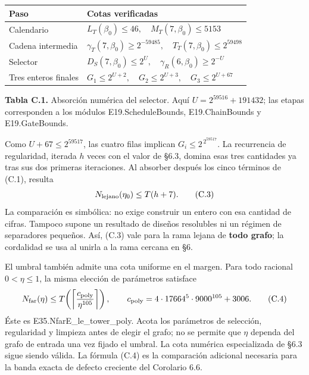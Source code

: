 \documentclass[spanish,11pt,a4paper]{article}
\newcounter{none}
\begin{document}

{\def\LTcaptype{none} %
\begin{longtable}[c]{@{}
  >{\raggedright\arraybackslash}p{}
  >{\raggedright\arraybackslash}p{}@{}}
\toprule\noalign{}
\begin{minipage}[b]{\linewidth}\raggedright
Paso
\end{minipage} & \begin{minipage}[b]{\linewidth}\raggedright
Cotas verificadas
\end{minipage} \\
\midrule\noalign{}
\endhead
\bottomrule\noalign{}
\endlastfoot
Calendario & \(L_T(\beta_0)\le46,\quad M_T(7,\beta_0)\le5153\) \\
Cadena intermedia & \(\gamma_T(7,\beta_0)\ge2^{-59485},\quad T_T(7,\beta_0)\le2^{59498}\) \\
Selector & \(D_S(7,\beta_0)\le2^U,\quad \gamma_R(6,\beta_0)\ge2^{-U}\) \\
Tres enteros finales & \(G_1\le2^{U+2},\quad G_2\le2^{U+3},\quad G_3\le2^{U+67}\) \\
\end{longtable}
}

\textbf{Tabla C.1.} Absorción numérica del selector. Aquí \(U=2^{59516}+191432\); las etapas corresponden a los módulos E19.ScheduleBounds, E19.ChainBounds y E19.GateBounds.

Como \(U+67\le2^{59517}\), las cuatro filas implican \(G_i\le2^{\,2^{59517}}\). La recurrencia de regularidad, iterada \(h\) veces con el valor de §6.3, domina esas tres cantidades ya tras sus dos primeras iteraciones. Al absorber después los cinco términos de (C.1), resulta \[
N_{\rm lejano}(\eta_0)\le T(h+7).
\tag{C.3}
\] La comparación es simbólica: no exige construir un entero con esa cantidad de cifras. Tampoco supone un resultado de diseños resolubles ni un régimen de separadores pequeños. Así, (C.3) vale para la rama lejana de \textbf{todo grafo}; la cordalidad se usa al unirla a la rama cercana en §6.

El umbral también admite una cota uniforme en el margen. Para todo racional \(0<\eta\le1\), la misma elección de parámetros satisface \[
N_{\rm far}(\eta)\le
T\!\left(\left\lceil\frac{c_{\rm poly}}{\eta^{105}}\right\rceil\right),
\qquad c_{\rm poly}=4\cdot17664^5\cdot9000^{105}+3006.
\tag{C.4}
\] Éste es {\ttfamily\small E35.\discretionary{\hbox{\ensuremath{\hookrightarrow}}}{}{}NfarE\_\discretionary{\hbox{\ensuremath{\hookrightarrow}}}{}{}le\_\discretionary{\hbox{\ensuremath{\hookrightarrow}}}{}{}tower\_\discretionary{\hbox{\ensuremath{\hookrightarrow}}}{}{}poly}. Acota los parámetros de selección, regularidad y limpieza antes de elegir el grafo; no se permite que \(\eta\) dependa del grafo de entrada una vez fijado el umbral. La cota numérica especializada de §6.3 sigue siendo válida. La fórmula (C.4) es la comparación adicional necesaria para la banda exacta de defecto creciente del Corolario 6.6.
\end{document}
